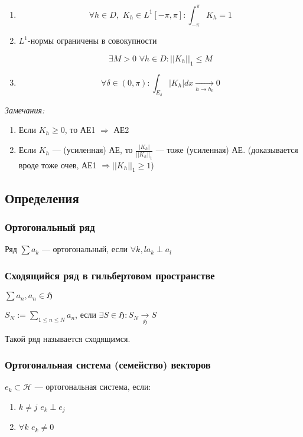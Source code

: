 \documentclass{article}
\def\dbl{\,\,}
\def\goesto#1{\underset{#1}{\longrightarrow}}
\begin{document}
\begin{enumerate}
    \item \[\forall h \in D, \dbl K_h \in L^1[-\pi, \pi]: \int_{-\pi}^{\pi} K_h = 1\]
    \item $L^1$-нормы ограничены в совокупности
    
    \[\exists M > 0 \dbl \forall h \in D : ||K_h||_1 \le M \]
    \item \[ \forall \delta \in (0, \pi) : \int_{E_{\delta}} |K_h| dx \goesto{h \rightarrow h_0} 0 \]
\end{enumerate}

\textit{Замечания:}

\begin{enumerate}
    \item Если $K_h \ge 0$, то АЕ1 $\Rightarrow$ АЕ2
    \item Если $K_h$ --- (усиленная) АЕ, то $\frac{|K_h|}{||K_h||_1}$ --- тоже (усиленная) АЕ. (доказывается вроде тоже очев, АЕ1 $\Rightarrow ||K_h||_1 \ge 1$)
\end{enumerate}
\newpage

\subsection{Определения}
\subsubsection{Ортогональный ряд}

Ряд $\sum a_k$ --- ортогональный, если $\forall k, l a_k \perp a_l$

\subsubsection{Сходящийся ряд в гильбертовом пространстве}

$\sum a_n, a_n \in \mathfrak{H}$

$S_N := \sum_{1 \le n \le N} a_n$, если $\exists S \in \mathfrak{H}: S_N \goesto{\mathfrak{H}} S$

Такой ряд называется сходящимся.

\subsubsection{Ортогональная система (семейство) векторов}

${e_k} \subset \mathcal{H}$ --- ортогональная система, если:

\begin{enumerate}
    \item $k \neq j \dbl e_k \perp e_j$
    \item $\forall k \dbl e_k \neq 0$
\end{enumerate}
\end{document}

